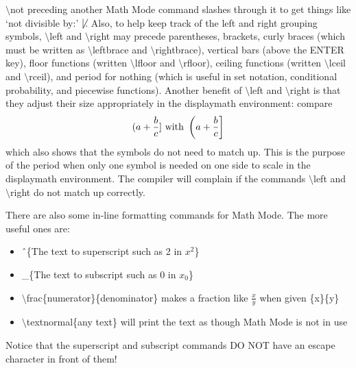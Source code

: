 \documentclass[10pt]{article}
\begin{document}
$ \setminus $not preceding another Math Mode command slashes through it to get things like `not divisible by:' $ \not\mid $.  Also, to help keep track of the left and right grouping symbols, $ \setminus $left and $ \setminus $right may precede parentheses, brackets, curly braces (which must be written as $ \setminus $leftbrace and $ \setminus $rightbrace), vertical bars (above the ENTER key), floor functions (written $ \setminus $lfloor and $ \setminus $rfloor), ceiling functions (written $ \setminus $lceil and $ \setminus $rceil), and period for nothing (which is useful in set notation, conditional probability, and piecewise functions).  Another benefit of $ \setminus $left and $ \setminus $right is that they adjust their size appropriately in the displaymath environment: compare $$ (a + \frac{b}{c}] \textnormal{ with } \left(a + \frac{b}{c}\right] $$ which also shows that the symbols do not need to match up.  This is the purpose of the period when only one symbol is needed on one side to scale in the displaymath environment.  The compiler will complain if the commands $ \setminus $left and $ \setminus $right do not match up correctly.
\par
There are also some in-line formatting commands for Math Mode.  The more useful ones are:
\begin{itemize}
\item \^\ \{The text to superscript such as 2 in $ x^{2} $\}
\item \_\{The text to subscript such as 0 in $ x_{0} $\}
\item $ \setminus $frac\{numerator\}\{denominator\} makes a fraction like $ \frac{x}{y} $ when given \{x\}\{y\}
\item $ \setminus $textnormal\{any text\} will print the text as though Math Mode is not in use
\end{itemize}
Notice that the superscript and subscript commands DO NOT have an escape character in front of them!
\end{document}

